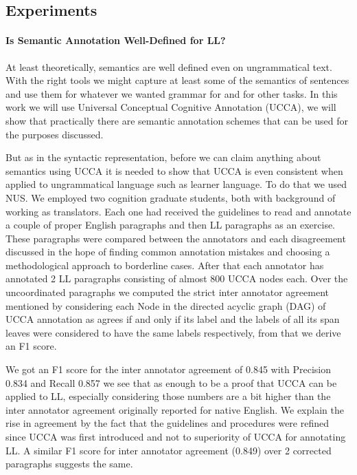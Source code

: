 \documentclass[english]{article}
\begin{document}
\subsection{Experiments}


\paragraph{Is Semantic Annotation Well-Defined for LL?}

At least theoretically, semantics are well defined even on ungrammatical
text. With the right tools we might capture at least some of the semantics
of sentences and use them for whatever we wanted grammar for and for
other tasks. In this work we will use Universal Conceptual Cognitive
Annotation (UCCA)\cite{abend2013universal}, we will show that practically
there are semantic annotation schemes that can be used for the purposes
discussed.

But as in the syntactic representation, before we can claim anything
about semantics using UCCA it is needed to show that UCCA is even
consistent when applied to ungrammatical language such as learner
language. To do that we used NUS\cite{dahlmeier2013building}.
We employed two cognition graduate students, both
with background of working as translators. Each
one had received the guidelines to read and annotate a couple of
proper English paragraphs and then LL paragraphs as
an exercise. These paragraphs were compared between the annotators
and each disagreement discussed in the hope of finding common annotation
mistakes and choosing a methodological approach to borderline cases.
After that each annotator has annotated 2 LL paragraphs
consisting of almost 800 UCCA nodes each. Over the uncoordinated paragraphs
we computed the strict inter annotator agreement mentioned by \cite{abend2013universal}
considering each Node in the directed acyclic graph (DAG) of UCCA
annotation as agrees if and only if its label and the labels of all
its span leaves were considered to have the same labels respectively,
from that we derive an F1 score. 

We got an F1 score for the inter annotator agreement of 0.845 with
Precision 0.834 and Recall 0.857 we see that as enough to be a proof
that UCCA can be applied to LL, especially considering those numbers
are a bit higher than the inter annotator agreement originally reported
for native English\cite{abend2013universal}.
We explain the rise in agreement by the fact that the guidelines and
procedures were refined since UCCA was first introduced and not to
superiority of UCCA for annotating LL. A similar F1
score for inter annotator agreement (0.849) over 2 corrected paragraphs
suggests the same.
\end{document}

